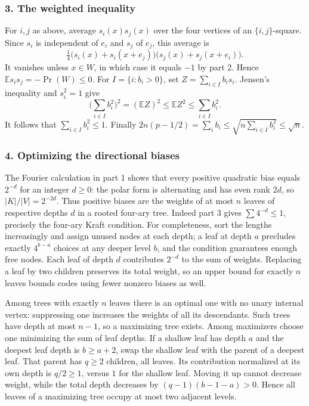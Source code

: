 \documentclass[
  10pt,
]{article}
\begin{document}
\subsubsection{3. The weighted
inequality}\label{the-weighted-inequality}

For \(i,j\) as above, average \(s_i(x)s_j(x)\) over the four vertices of
an \(\{i,j\}\)-square. Since \(s_i\) is independent of \(e_i\) and
\(s_j\) of \(e_j\), this average is \[
\tfrac14\big(s_i(x)+s_i(x+e_j)\big)\big(s_j(x)+s_j(x+e_i)\big).
\] It vanishes unless \(x\in W\), in which case it equals \(-1\) by part
2. Hence \(\mathbb E s_i s_j=-\Pr(W)\le0\). For \(I=\{i:b_i>0\}\), set
\(Z=\sum_{i\in I} b_i s_i\). Jensen's inequality and \(s_i^2=1\) give \[
\Big(\sum_{i\in I}b_i^2\Big)^2=(\mathbb E Z)^2\le\mathbb E Z^2\le\sum_{i\in I}b_i^2.
\] It follows that \(\sum_{i\in I}b_i^2\le1\). Finally
\(2n(p-1/2)=\sum_i b_i\le\sqrt{n\sum_{i\in I} b_i^2}\le\sqrt n\).

\subsubsection{4. Optimizing the directional
biases}\label{optimizing-the-directional-biases}

The Fourier calculation in part 1 shows that every positive quadratic
bias equals \(2^{-d}\) for an integer \(d\ge0\): the polar form is
alternating and has even rank \(2d\), so \(|K|/|V|=2^{-2d}\). Thus
positive biases are the weights of at most \(n\) leaves of respective
depths \(d\) in a rooted four-ary tree. Indeed part 3 gives
\(\sum 4^{-d}\le1\), precisely the four-ary Kraft condition. For
completeness, sort the lengths increasingly and assign unused nodes at
each depth; a leaf at depth \(a\) precludes exactly \(4^{b-a}\) choices
at any deeper level \(b\), and the condition guarantees enough free
nodes. Each leaf of depth \(d\) contributes \(2^{-d}\) to the sum of
weights. Replacing a leaf by two children preserves its total weight, so
an upper bound for exactly \(n\) leaves bounds codes using fewer nonzero
biases as well.

Among trees with exactly \(n\) leaves there is an optimal one with no
unary internal vertex: suppressing one increases the weights of all its
descendants. Such trees have depth at most \(n-1\), so a maximizing tree
exists. Among maximizers choose one minimizing the sum of leaf depths.
If a shallow leaf has depth \(a\) and the deepest leaf depth is
\(b\ge a+2\), swap the shallow leaf with the parent of a deepest leaf.
That parent has \(q\ge2\) children, all leaves. Its contribution
normalized at its own depth is \(q/2\ge1\), versus \(1\) for the shallow
leaf. Moving it up cannot decrease weight, while the total depth
decreases by \((q-1)(b-1-a)>0\). Hence all leaves of a maximizing tree
occupy at most two adjacent levels.
\end{document}
